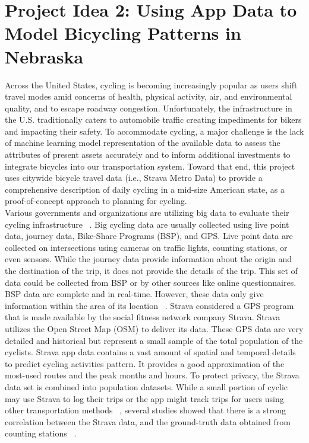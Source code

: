 \documentclass{report}
\begin{document}
\section{Project Idea 2: Using App Data to Model Bicycling Patterns in Nebraska}

Across the United States, cycling is becoming increasingly popular as users shift travel modes amid concerns of health, physical activity, air, and environmental quality, and to escape roadway congestion. Unfortunately, the infrastructure in the U.S. traditionally caters to automobile traffic creating impediments for bikers and impacting their safety. To accommodate cycling, a major challenge is the lack of machine learning model representation of the available data to assess the attributes of present assets accurately and to inform additional investments to integrate bicycles into our transportation system. Toward that end, this project uses citywide bicycle travel data (i.e., Strava Metro Data) to provide a comprehensive description of daily cycling in a mid-size American state, as a proof-of-concept approach to planning for cycling. 
\\Various governments and organizations are utilizing big data to evaluate their cycling infrastructure ~\cite{hall2012open}. Big cycling data are usually collected using live point data, journey data, Bike-Share Programs (BSP), and GPS. Live point data are collected on intersections using cameras on traffic lights, counting stations, or even sensors. While the journey data provide information about the origin and the destination of the trip, it does not provide the details of the trip. This set of data could be collected from BSP or by other sources like online questionnaires. BSP data are complete and in real-time. However, these data only give information within the area of its location ~\cite{ romanillos2016big, rogers2000counting}. Strava considered a GPS program that is made available by the social fitness network company Strava. Strava utilizes the Open Street Map (OSM) to deliver its data. These GPS data are very detailed and historical but represent a small sample of the total population of the cyclists.  
Strava app data contains a vast amount of spatial and temporal details to predict cycling activities pattern. It provides a good approximation of the most-used routes and the peak months and hours. To protect privacy, the Strava data set is combined into population datasets. While a small portion of cyclic may use Strava to log their trips or the app might track trips for users using other transportation methods ~\cite{hall2012open, romanillos2016big, fishman2016cycling }, several studies showed that there is a strong correlation between the Strava data, and the ground-truth data obtained from counting stations ~\cite{hong2020evaluation, jestico2016mapping}. 
\end{document}
